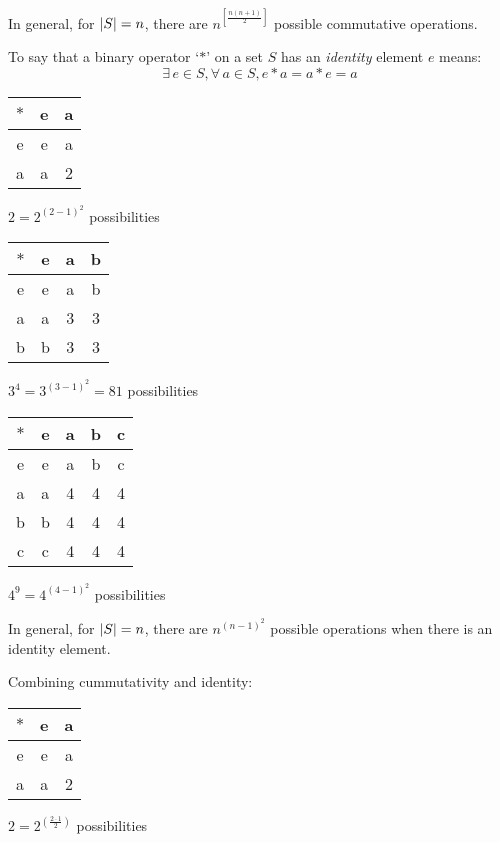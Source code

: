 \documentclass[letterpaper,12pt,fleqn]{article}
\begin{document}
\bigskip
  
In general, for $\lvert S\rvert=n$, there are $n^{\left[\frac{n(n+1)}{2}\right]}$ possible
commutative operations.

\begin{definition}
  To say that a binary operator `$*$' on a set $S$ has an \emph{identity}
  element $e$ means:
  \[\exists\,e\in S,\forall\,a\in S,e*a=a*e=a\]
\end{definition}

\begin{tabular}{c|cc}
  $*$ & e & a \\
  \hline
  e & e & a \\
  a & a & 2 \\
\end{tabular}\hspace{0.25in}
$2=2^{(2-1)^2}$ possibilities

\begin{tabular}{c|ccc}
  $*$ & e & a & b \\
  \hline
  e & e & a & b \\
  a & a & 3 & 3 \\
  b & b & 3 & 3 \\
\end{tabular}\hspace{0.25in}
$3^4=3^{(3-1)^2}=81$ possibilities

\begin{tabular}{c|cccc}
  $*$ & e & a & b & c \\
  \hline
  e & e & a & b & c \\
  a & a & 4 & 4 & 4 \\
  b & b & 4 & 4 & 4 \\
  c & c & 4 & 4 & 4 \\
\end{tabular}\hspace{0.25in}
$4^9=4^{(4-1)^2}$ possibilities

\bigskip
  
In general, for $\lvert S\rvert=n$, there are $n^{(n-1)^2}$ possible operations when
there is an identity element.

Combining cummutativity and identity:

\begin{tabular}{c|cc}
  $*$ & e & a \\
  \hline
  e & e & a \\
  a & a & 2 \\
\end{tabular}\hspace{0.25in}
$2=2^{\left(\frac{2\cdot1}{2}\right)}$ possibilities
\end{document}

